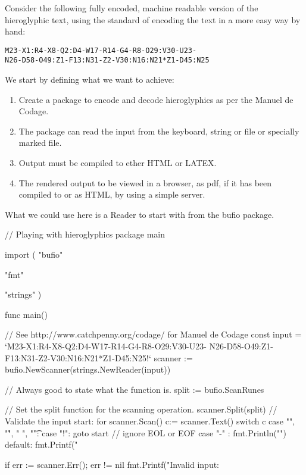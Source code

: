 \medskip

Consider the following fully encoded, machine readable version of the hieroglyphic text, using the standard of encoding the text in a more easy way by hand:


\begin{verbatim}
M23-X1:R4-X8-Q2:D4-W17-R14-G4-R8-O29:V30-U23-
N26-D58-O49:Z1-F13:N31-Z2-V30:N16:N21*Z1-D45:N25
\end{verbatim}


We start by defining what we want to achieve:

\begin{enumerate}
\item Create a package to encode and decode hieroglyphics as per the Manuel de Codage.
\item The package can read the input from the keyboard, string or file or specially marked \latexe file.
\item Output must be compiled to ether HTML or LATEX.
\item The rendered output to be viewed in a browser, as pdf, if it has been compiled to \latexe or as HTML, by using a simple server.
\end{enumerate}


What we could use here is a Reader to start with from the bufio package. 

\newenvironment{go}{%
}{\endminted}


\begin{go}
// Playing with hieroglyphics
package main

import (
	"bufio"

	"fmt"

	"strings"
)

func main() {
	// See http://www.catchpenny.org/codage/ for Manuel de Codage
	const input = `M23-X1:R4-X8-Q2:D4-W17-R14-G4-R8-O29:V30-U23-
	               N26-D58-O49:Z1-F13:N31-Z2-V30:N16:N21*Z1-D45:N25!`
	scanner := bufio.NewScanner(strings.NewReader(input))

	// Always good to state what the function is.
	split := bufio.ScanRunes

	// Set the split function for the scanning operation.
	scanner.Split(split)
	// Validate the input
start:	
	for scanner.Scan() {
		c:= scanner.Text()
		switch c {
		  case "\n", "\r", " ", "\t": 
		  case "!": goto start // ignore EOL or EOF
		  case "-" : fmt.Println("")
		  default: fmt.Printf("%
		}
	}

	if err := scanner.Err(); err != nil {
		fmt.Printf("Invalid input: %
	}

}
\end{go}

